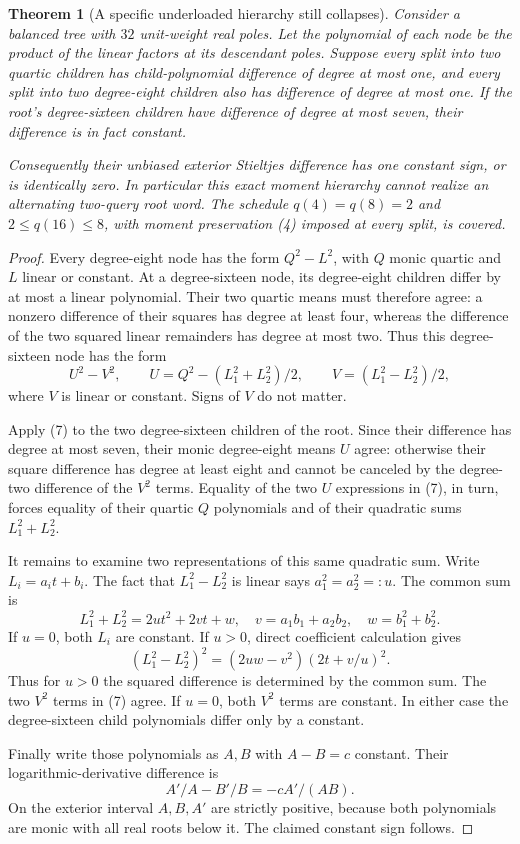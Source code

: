 \documentclass[11pt]{article}
\newtheorem{theorem}{Theorem}
\begin{document}
\begin{theorem}[A specific underloaded hierarchy still collapses]
Consider a balanced tree with $32$ unit-weight real poles. Let the
polynomial of each node be the product of the linear factors at its
descendant poles. Suppose every split into two quartic children has
child-polynomial difference of degree at most one, and every split
into two degree-eight children also has difference of degree at most
one. If the root's degree-sixteen children have difference of degree
at most seven, their difference is in fact constant.

Consequently their unbiased exterior Stieltjes difference has one
constant sign, or is identically zero. In particular this exact
moment hierarchy cannot realize an alternating two-query root word.
The schedule $q(4)=q(8)=2$ and $2\leq q(16)\leq8$, with moment
preservation (4) imposed at every split, is covered.
\end{theorem}
\begin{proof}
Every degree-eight node has the form $Q^2-L^2$, with $Q$ monic
quartic and $L$ linear or constant. At a degree-sixteen node, its
degree-eight children differ by at most a linear polynomial. Their
two quartic means must therefore agree: a nonzero difference of
their squares has degree at least four, whereas the difference of
the two squared linear remainders has degree at most two.
Thus this degree-sixteen node has the form
\[
 U^2-V^2,\qquad
 U=Q^2-(L_1^2+L_2^2)/2,\qquad
 V=(L_1^2-L_2^2)/2,
                                                               \tag{7}
\]
where $V$ is linear or constant. Signs of $V$ do not matter.

Apply (7) to the two degree-sixteen children of the root. Since
their difference has degree at most seven, their monic degree-eight
means $U$ agree: otherwise their square difference has degree at
least eight and cannot be canceled by the degree-two difference of
the $V^2$ terms. Equality of the two $U$ expressions in (7), in
turn, forces equality of their quartic $Q$ polynomials and of their
quadratic sums $L_1^2+L_2^2$.

It remains to examine two representations of this same quadratic
sum. Write $L_i=a_it+b_i$. The fact that $L_1^2-L_2^2$ is linear
says $a_1^2=a_2^2=:u$. The common sum is
\[
             L_1^2+L_2^2=2ut^2+2vt+w,
 \quad v=a_1b_1+a_2b_2,\quad w=b_1^2+b_2^2.
\]
If $u=0$, both $L_i$ are constant. If $u>0$, direct coefficient
calculation gives
\[
 (L_1^2-L_2^2)^2
       =(2uw-v^2)(2t+v/u)^2.                              \tag{8}
\]
Thus for $u>0$ the squared difference is determined by the common
sum. The two $V^2$ terms in (7) agree. If $u=0$, both $V^2$ terms
are constant. In either case the degree-sixteen child polynomials
differ only by a constant.

Finally write those polynomials as $A,B$ with $A-B=c$ constant.
Their logarithmic-derivative difference is
\[
                 A'/A-B'/B=-cA'/(AB).
\]
On the exterior interval $A,B,A'$ are strictly positive, because
both polynomials are monic with all real roots below it. The claimed
constant sign follows.
\end{proof}
\end{document}

